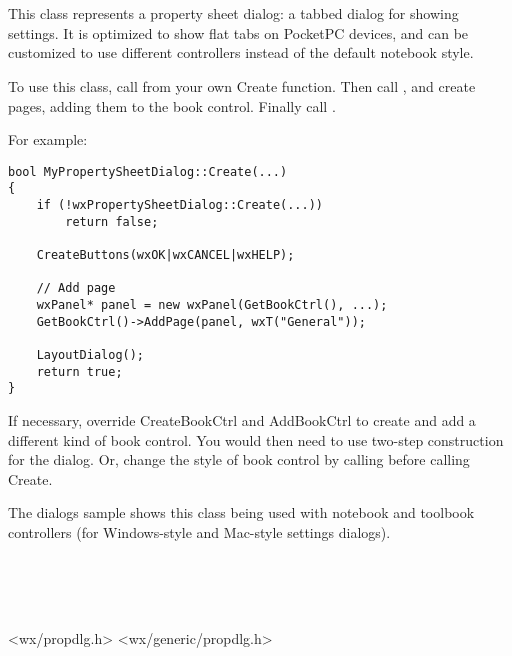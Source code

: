 \section{}\label{wxpropertysheetdialog}

This class represents a property sheet dialog: a tabbed dialog
for showing settings. It is optimized to show flat tabs
on PocketPC devices, and can be customized to use different
controllers instead of the default notebook style.

To use this class, call  from your own
Create function. Then call , and create pages, adding them to the book control.
Finally call .

For example:

\begin{verbatim}
bool MyPropertySheetDialog::Create(...)
{
    if (!wxPropertySheetDialog::Create(...))
        return false;

    CreateButtons(wxOK|wxCANCEL|wxHELP);

    // Add page
    wxPanel* panel = new wxPanel(GetBookCtrl(), ...);
    GetBookCtrl()->AddPage(panel, wxT("General"));

    LayoutDialog();
    return true;
}
\end{verbatim}

If necessary, override CreateBookCtrl and AddBookCtrl to create and add a different
kind of book control. You would then need to use two-step construction for the dialog.
Or, change the style of book control by calling  
before calling Create.

The dialogs sample shows this class being used with notebook and toolbook controllers (for
Windows-style and Mac-style settings dialogs).


\\
\\
\\


<wx/propdlg.h>
<wx/generic/propdlg.h>


